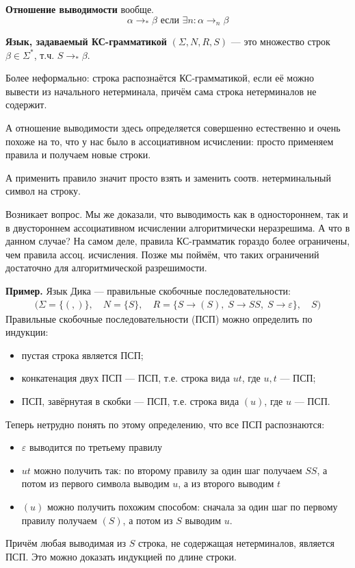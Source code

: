 \begin{conj}
    \textbf{Отношение выводимости} вообще.
    $$ \alpha \to_* \beta \text{ если } \exists n : \alpha \to_n \beta $$
\end{conj}

\begin{conj}
    \textbf{Язык, задаваемый КС-грамматикой} $(\Sigma, N, R, S)$ --- это множество строк $\beta \in \Sigma^*$, т.ч. $S \to_* \beta$.
\end{conj}

Более неформально: строка распознаётся КС-грамматикой, если её можно вывести из начального нетерминала, причём сама строка нетерминалов не содержит. 

А отношение выводимости здесь определяется совершенно естественно и очень похоже на то, что у нас было в ассоциативном исчислении: просто применяем правила и получаем новые строки. 

А применить правило значит просто взять и заменить соотв. нетерминальный символ на строку.

Возникает вопрос. Мы же доказали, что выводимость как в одностороннем, так и в двустороннем ассоциативном исчислении алгоритмически неразрешима. А что в данном случае? На самом деле, правила КС-грамматик гораздо более ограничены, чем правила ассоц. исчисления. Позже мы поймём, что таких ограничений достаточно для алгоритмической разрешимости. 

\textbf{Пример.} Язык Дика --- правильные скобочные последовательности:
\begin{gather*}
    \bigg(\Sigma = \{ (, ) \}, \quad N = \{ S \}, \quad R = \{ S \to (S), \; S \to S S, \; S \to \varepsilon \}, \quad S \bigg)
\end{gather*} 
Правильные скобочные последовательности (ПСП) можно определить по индукции:
\begin{itemize}
    \item пустая строка является ПСП;
    \item конкатенация двух ПСП --- ПСП, т.е. строка вида $ut$, где $u,t$ --- ПСП;
    \item ПСП, завёрнутая в скобки --- ПСП, т.е. строка вида $(u)$, где $u$ --- ПСП.
\end{itemize}
Теперь нетрудно понять по этому определению, что все ПСП распознаются:
\begin{itemize}
    \item $\varepsilon$ выводится по третьему правилу
    \item $ut$ можно получить так: по второму правилу за один шаг получаем $S S$, а потом из первого символа выводим $u$, а из второго выводим $t$
    \item $(u)$ можно получить похожим способом: сначала за один шаг по первому правилу получаем $(S)$, а потом из $S$ выводим $u$.
\end{itemize}
Причём любая выводимая из $S$ строка, не содержащая нетерминалов, является ПСП. Это можно доказать индукцией по длине строки.

